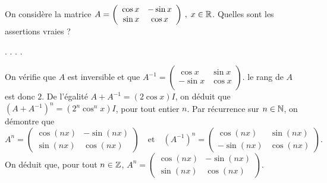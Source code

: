 \begin{question}
On considère la matrice $A = \left(\begin{array}{rc}
\cos x&-\sin x\\\sin x&\cos x\\ \end{array}\right) \, , \; x \in \mathbb{R}$. Quelles sont les assertions vraies ?
\begin{answers}  
.
.
.
.
\end{answers}
\begin{explanations} On vérifie que $A$ est inversible et que $A^{-1} = \left(\begin{array}{rc}\cos x&\sin x\\-\sin x&\cos x\\ 
\end{array}\right)$. le rang de $A$ est donc $2$.
\vskip0mm
De l'égalité $A+A^{-1}=(2\cos x) I$, on déduit que $(A+A^{-1})^n = (2^n\cos^n x) I$, pour tout entier $n$.
\vskip0mm
Par récurrence sur $n\in \mathbb{N}$, on démontre que 
$$A^n =  \left(\begin{array}{rc}\cos (nx)&-\sin (nx)\\
\sin (nx)&\cos (nx) \end{array}\right)\quad \mbox{et}\quad (A^{-1})^n =  \left(\begin{array}{rc}\cos (nx)&\sin (nx)\\ -\sin (nx)&\cos (nx)\end{array}\right).$$
On déduit que, pour tout $n \in \mathbb{Z}$, $A^n=\left(\begin{array}{rc}\cos (nx)&-\sin (nx)\\\sin (nx)&\cos (nx)\end{array}\right)$.
\end{explanations}
\end{question}

